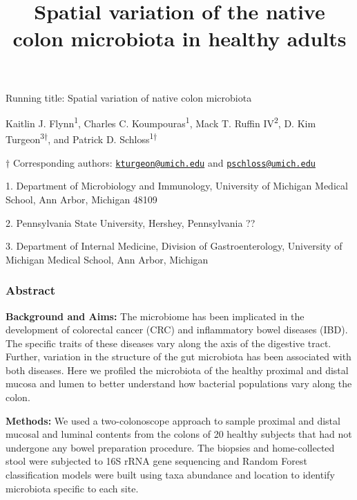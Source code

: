 \documentclass[12pt,]{article}
\title{Spatial variation of the native colon microbiota in healthy adults}
\author{}
\date{}
\begin{document}
\maketitle

\vspace{15mm}

Running title: Spatial variation of native colon microbiota

\vspace{15mm}

Kaitlin J. Flynn\textsuperscript{1}, Charles C.
Koumpouras\textsuperscript{1}, Mack T. Ruffin IV\textsuperscript{2}, D.
Kim Turgeon\textsuperscript{3\(\dagger\)}, and Patrick D.
Schloss\textsuperscript{1\(\dagger\)}

\vspace{15mm}

\(\dagger\) Corresponding authors:
\href{mailto:kturgeon@umich.edu}{\nolinkurl{kturgeon@umich.edu}} and
\href{mailto:pschloss@umich.edu}{\nolinkurl{pschloss@umich.edu}}

1. Department of Microbiology and Immunology, University of Michigan
Medical School, Ann Arbor, Michigan 48109

2. Pennsylvania State University, Hershey, Pennsylvania ??

3. Department of Internal Medicine, Division of Gastroenterology,
University of Michigan Medical School, Ann Arbor, Michigan

\newpage

\subsubsection{Abstract}\label{abstract}

\textbf{Background and Aims:} The microbiome has been implicated in the
development of colorectal cancer (CRC) and inflammatory bowel diseases
(IBD). The specific traits of these diseases vary along the axis of the
digestive tract. Further, variation in the structure of the gut
microbiota has been associated with both diseases. Here we profiled the
microbiota of the healthy proximal and distal mucosa and lumen to better
understand how bacterial populations vary along the colon.

\textbf{Methods:} We used a two-colonoscope approach to sample proximal
and distal mucosal and luminal contents from the colons of 20 healthy
subjects that had not undergone any bowel preparation procedure. The
biopsies and home-collected stool were subjected to 16S rRNA gene
sequencing and Random Forest classification models were built using taxa
abundance and location to identify microbiota specific to each site.
\end{document}
